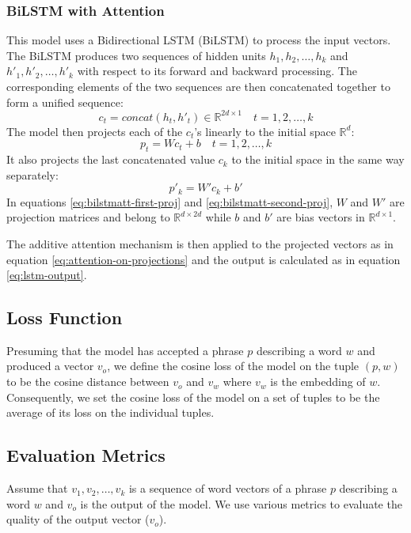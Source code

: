 \documentclass{article}
\begin{document}
\subsubsection{BiLSTM with Attention}
This model uses a Bidirectional LSTM (BiLSTM) \citep{schuster1997bidirectional} to process the input vectors. The BiLSTM produces two sequences of hidden units $h_1,h_2,\dots,h_k$ and $h'_1,h'_2,\dots,h'_k$ with respect to its forward and backward processing. The corresponding elements of the two sequences are then concatenated together to form a unified sequence:
\begin{equation}
c_t = concat(h_t, h'_t) \in \mathbb{R}^{2d\times1} \quad t=1,2,\dots,k
\end{equation}
The model then projects each of the $c_t$'s linearly to the initial space $\mathbb{R}^{d}$:
\begin{equation}
p_t = W c_t+b \quad t=1,2,\dots,k
\label{eq:bilstmatt-first-proj}
\end{equation}
It also projects the last concatenated value $c_k$ to the initial space in the same way separately:
\begin{equation}
p'_k = W' c_k+b'
\label{eq:bilstmatt-second-proj}
\end{equation}
In equations \ref{eq:bilstmatt-first-proj} and \ref{eq:bilstmatt-second-proj}, $W$ and $W'$ are projection matrices and belong to $\mathbb{R}^{d\times 2d}$ while $b$ and $b'$ are bias vectors in $\mathbb{R}^{d\times1}$.

The additive attention mechanism is then applied to the projected vectors as in equation \ref{eq:attention-on-projections} and the output is calculated as in equation \ref{eq:lstm-output}.
\subsection{Loss Function}
Presuming that the model has accepted a phrase $p$ describing a word $w$ and produced a vector $v_o$, we define the cosine loss of the model on the tuple $(p,w)$ to be the cosine distance between $v_o$ and $v_w$ where $v_w$ is the embedding of $w$. Consequently, we  set the cosine loss of the model on a set of tuples to be the average of its loss on the individual tuples. 
\subsection{Evaluation Metrics \label{sec:eval-metrics}}
Assume that $v_1,v_2,\dots,v_k$ is a sequence of word vectors of a phrase $p$ describing a word $w$ and $v_o$ is the output of the model. We use various metrics to evaluate the quality of the output vector ($v_o$).
\end{document}
